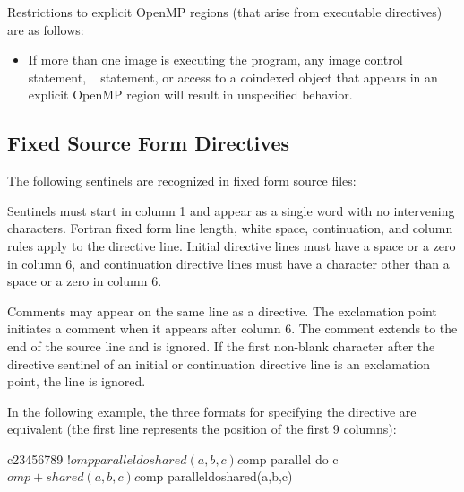 \begin{fortranspecific}
Restrictions to explicit OpenMP regions (that arise from executable
directives) are as follows:

\begin{itemize}
\item If more than one image is executing the program, any image control
statement, ~ statement, or access to a coindexed
object that appears in an explicit OpenMP region will result in
unspecified behavior.
\end{itemize}


\subsection{Fixed Source Form Directives}
\label{subsec:Fixed Source Form Directives}

The following sentinels are recognized in fixed form source files:


Sentinels must start in column 1 and appear as a single word with no intervening
characters. Fortran fixed form line length, white space, continuation, and column 
rules apply to the directive line. Initial directive lines must have a space or 
a zero in column 6, and continuation directive lines must have a character other 
than a space or a zero in column 6.

Comments may appear on the same line as a directive. The exclamation point initiates a
comment when it appears after column 6. The comment extends to the end of the source
line and is ignored. If the first non-blank character after the directive sentinel of 
an initial or continuation directive line is an exclamation point, the line is ignored.

\begin{note}
In the following example, the three formats for specifying the directive are
equivalent (the first line represents the position of the first 9 columns):

\begin{ompfPragma}
c23456789
!$omp parallel do shared(a,b,c)

c$omp parallel do
c$omp+shared(a,b,c)

c$omp paralleldoshared(a,b,c)
\end{ompfPragma}
\end{note}




\end{fortranspecific}
